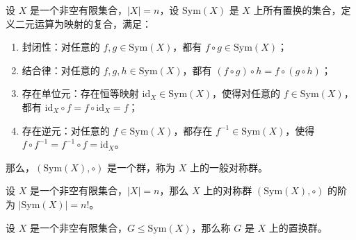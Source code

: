 \begin{definition}
    设 $X$ 是一个非空有限集合，$|X| = n$，设 $\mathrm{Sym}(X)$ 是 $X$ 上所有置换的集合，定义二元运算为映射的复合，满足：
    \begin{enumerate}
        \item 封闭性：对任意的 $f, g\in \mathrm{Sym}(X)$，都有 $f \circ g \in \mathrm{Sym}(X)$；
        \item 结合律：对任意的 $f, g, h\in \mathrm{Sym}(X)$，都有 $(f \circ g) \circ h = f \circ (g \circ h)$；
        \item 存在单位元：存在恒等映射 $\mathrm{id}_X\in \mathrm{Sym}(X)$，使得对任意的 $f\in \mathrm{Sym}(X)$，都有 $\mathrm{id}_X \circ f = f \circ \mathrm{id}_X = f$；
        \item 存在逆元：对任意的 $f\in \mathrm{Sym}(X)$，都存在 $f^{-1}\in \mathrm{Sym}(X)$，使得 $f \circ f^{-1} = f^{-1} \circ f = \mathrm{id}_X$。
    \end{enumerate}
    那么，$(\mathrm{Sym}(X),\circ)$ 是一个群，称为 $X$ 上的一般对称群。
\end{definition}

\begin{proposition}
    设 $X$ 是一个非空有限集合，$|X| = n$，那么 $X$ 上的对称群 $(\mathrm{Sym}(X),\circ)$ 的阶为 $|\mathrm{Sym}(X)|=n!$。
\end{proposition}
\vspace{0.5em}

\begin{definition}
    设 $X$ 是一个非空有限集合，$G\le \mathrm{Sym}(X)$，那么称 $G$ 是 $X$ 上的置换群。
\end{definition}

